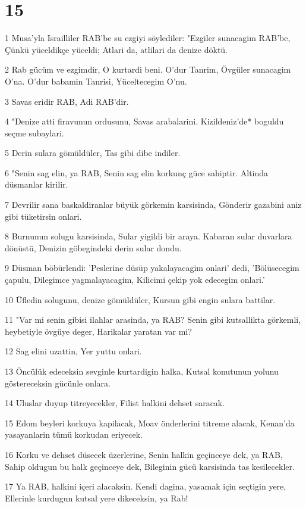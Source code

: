 \chapter{15}

\par 1 Musa'yla Israilliler RAB'be su ezgiyi söylediler: "Ezgiler sunacagim RAB'be, Çünkü yüceldikçe yüceldi; Atlari da, atlilari da denize döktü.
\par 2 Rab gücüm ve ezgimdir, O kurtardi beni. O'dur Tanrim, Övgüler sunacagim O'na. O'dur babamin Tanrisi, Yüceltecegim O'nu.
\par 3 Savas eridir RAB, Adi RAB'dir.
\par 4 "Denize atti firavunun ordusunu, Savas arabalarini. Kizildeniz'de* boguldu seçme subaylari.
\par 5 Derin sulara gömüldüler, Tas gibi dibe indiler.
\par 6 "Senin sag elin, ya RAB, Senin sag elin korkunç güce sahiptir. Altinda düsmanlar kirilir.
\par 7 Devrilir sana baskaldiranlar büyük görkemin karsisinda, Gönderir gazabini aniz gibi tüketirsin onlari.
\par 8 Burnunun solugu karsisinda, Sular yigildi bir araya. Kabaran sular duvarlara dönüstü, Denizin göbegindeki derin sular dondu.
\par 9 Düsman böbürlendi: 'Peslerine düsüp yakalayacagim onlari' dedi, 'Bölüsecegim çapulu, Dilegimce yagmalayacagim, Kilicimi çekip yok edecegim onlari.'
\par 10 Üfledin solugunu, denize gömüldüler, Kursun gibi engin sulara battilar.
\par 11 "Var mi senin gibisi ilahlar arasinda, ya RAB? Senin gibi kutsallikta görkemli, heybetiyle övgüye deger, Harikalar yaratan var mi?
\par 12 Sag elini uzattin, Yer yuttu onlari.
\par 13 Öncülük edeceksin sevginle kurtardigin halka, Kutsal konutunun yolunu göstereceksin gücünle onlara.
\par 14 Uluslar duyup titreyecekler, Filist halkini dehset saracak.
\par 15 Edom beyleri korkuya kapilacak, Moav önderlerini titreme alacak, Kenan'da yasayanlarin tümü korkudan eriyecek.
\par 16 Korku ve dehset düsecek üzerlerine, Senin halkin geçinceye dek, ya RAB, Sahip oldugun bu halk geçinceye dek, Bileginin gücü karsisinda tas kesilecekler.
\par 17 Ya RAB, halkini içeri alacaksin. Kendi dagina, yasamak için seçtigin yere, Ellerinle kurdugun kutsal yere dikeceksin, ya Rab!
